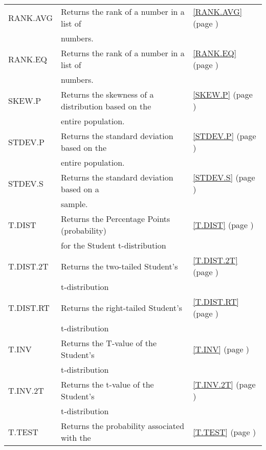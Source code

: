 \begin{center}
\begin{longtable}{l l l }
		RANK.AVG & Returns the rank of a number in a list of &  \ref{RANK.AVG} (page \pageref{RANK.AVG}) \index{Spreadsheet Functions!RANK.AVG} \\
		& numbers. &   \\
		RANK.EQ & Returns the rank of a number in a list of  &  \ref{RANK.EQ} (page \pageref{RANK.EQ}) \index{Spreadsheet Functions!RANK.EQ} \\
		& numbers. &   \\
		SKEW.P & Returns the skewness of a distribution based on the &  \ref{SKEW.P} (page \pageref{SKEW.P}) \index{Spreadsheet Functions!SKEW.P} \\
		&  entire population. &   \\
		STDEV.P & Returns the standard deviation based on the &  \ref{STDEV.P} (page \pageref{STDEV.P}) \index{Spreadsheet Functions!STDEV.P} \\
		&  entire population. &   \\
		STDEV.S & Returns the standard deviation based on a &  \ref{STDEV.S} (page \pageref{STDEV.S}) \index{Spreadsheet Functions!STDEV.S} \\
		& sample.  &   \\
		T.DIST & Returns the Percentage Points (probability)  &  \ref{T.DIST} (page \pageref{T.DIST}) \index{Spreadsheet Functions!T.DIST} \\
		& for the Student t-distribution &   \\
		T.DIST.2T & Returns the two-tailed Student's &  \ref{T.DIST.2T} (page \pageref{T.DIST.2T}) \index{Spreadsheet Functions!T.DIST.2T} \\
		& t-distribution &   \\    
		T.DIST.RT & Returns the right-tailed Student's  &  \ref{T.DIST.RT} (page \pageref{T.DIST.RT}) \index{Spreadsheet Functions!T.DIST.RT} \\
		& t-distribution &   \\    
		T.INV & Returns the T-value of the Student's &  \ref{T.INV} (page \pageref{T.INV}) \index{Spreadsheet Functions!T.INV} \\
		& t-distribution &   \\
		T.INV.2T & Returns the t-value of the Student's &  \ref{T.INV.2T} (page \pageref{T.INV.2T}) \index{Spreadsheet Functions!T.INV.2T} \\
		& t-distribution &   \\
		T.TEST & Returns the probability associated with the  &  \ref{T.TEST} (page \pageref{T.TEST}) \index{Spreadsheet Functions!T.TEST} \\

\end{longtable}
\end{center}
